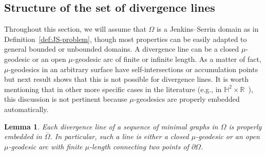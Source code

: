 \documentclass[a4paper,10pt,reqno]{amsart}
\newcommand{\R}{\mathbb{R}}
\newtheorem{lemma}[theorem]{Lemma}
\theoremstyle{definition}
\theoremstyle{remark}
\numberwithin{equation}{section}
\begin{document}
\subsection{Structure of the set of divergence lines}\label{subsec:divlines}
Throughout this section, we will assume that $\Omega$ is a Jenkins--Serrin domain as in Definition~\ref{def:JS-problem}, though most properties can be easily adapted to general bounded or unbounded domains. A divergence line can be a closed $\mu$-geodesic or an open $\mu$-geodesic arc of finite or infinite length. As a matter of fact, $\mu$-geodesics in an arbitrary surface have self-intersections or accumulation points but next result shows that this is not possible for divergence lines. It is worth mentioning that in other more specific cases in the literature (e.g., in $\mathbb{H}^2\times\R$~\cite{MRR}), this discussion is not pertinent because $\mu$-geodesics are properly embedded automatically.


\begin{lemma}\label{lem:divline-properly-embedded}
Each divergence line of a sequence of minimal graphs in $\Omega$ is properly embedded in $\overline\Omega$. In particular, such a line is either a closed $\mu$-geodesic or an open $\mu$-geodesic arc with finite $\mu$-length connecting two points of $\partial\Omega$.
\end{lemma}
\end{document}
